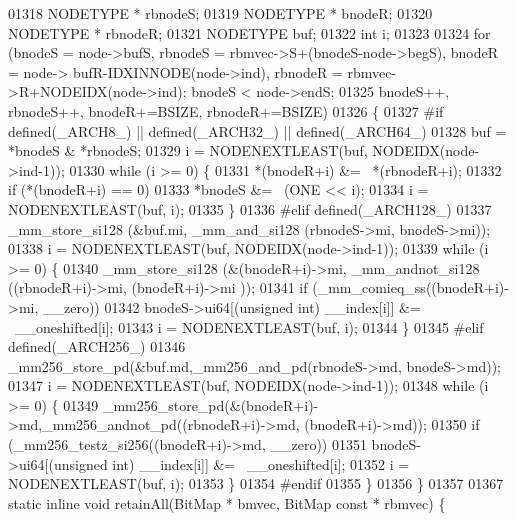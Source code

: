 \begin{DoxyCode}
{01318         NODETYPE * rbnodeS;
01319         NODETYPE * bnodeR;
01320         NODETYPE * rbnodeR;
01321         NODETYPE buf;
01322         \textcolor{keywordtype}{int} i;
01323 
01324         \textcolor{keywordflow}{for} (bnodeS = node->bufS, rbnodeS = rbmvec->S+(bnodeS-node->begS), bnodeR = node->
      bufR-IDXINNODE(node->ind), rbnodeR = rbmvec->R+NODEIDX(node->ind); bnodeS < node->endS;
01325                         bnodeS++, rbnodeS++, bnodeR+=BSIZE, rbnodeR+=BSIZE)
01326         \{
01327 \textcolor{preprocessor}{#if defined(\_ARCH8\_) || defined(\_ARCH32\_) || defined(\_ARCH64\_)}
01328                 buf = *bnodeS & *rbnodeS;
01329                 i = NODENEXTLEAST(buf, NODEIDX(node->ind-1));
01330                 \textcolor{keywordflow}{while} (i >= 0) \{
01331                         *(bnodeR+i) &= ~*(rbnodeR+i);
01332                         \textcolor{keywordflow}{if} (*(bnodeR+i) == 0)
01333                                 *bnodeS &= ~(ONE << i);
01334                         i = NODENEXTLEAST(buf, i);
01335                 \}
01336 \textcolor{preprocessor}{#elif defined(\_ARCH128\_)}
01337                 \_mm\_store\_si128 (&buf.mi, \_mm\_and\_si128 (rbnodeS->mi, bnodeS->mi));
01338                 i = NODENEXTLEAST(buf, NODEIDX(node->ind-1));
01339                 \textcolor{keywordflow}{while} (i >= 0) \{
01340                         \_mm\_store\_si128 (&(bnodeR+i)->mi, \_mm\_andnot\_si128 ((rbnodeR+i)->mi, (bnodeR+i)->mi
      ));
01341                         \textcolor{keywordflow}{if} (\_mm\_comieq\_ss((bnodeR+i)->mi, \_\_zero))
01342                                 bnodeS->ui64[(\textcolor{keywordtype}{unsigned} int) \_\_index[i]] &= ~\_\_oneshifted[i];
01343                         i = NODENEXTLEAST(buf, i);
01344                 \}
01345 \textcolor{preprocessor}{#elif defined(\_ARCH256\_)}
01346                 \_mm256\_store\_pd(&buf.md,\_mm256\_and\_pd(rbnodeS->md, bnodeS->md));
01347                 i = NODENEXTLEAST(buf, NODEIDX(node->ind-1));
01348                 \textcolor{keywordflow}{while} (i >= 0) \{
01349                         \_mm256\_store\_pd(&(bnodeR+i)->md,\_mm256\_andnot\_pd((rbnodeR+i)->md, (bnodeR+i)->md));
01350                         \textcolor{keywordflow}{if} (\_mm256\_testz\_si256((bnodeR+i)->md, \_\_zero))
01351                                 bnodeS->ui64[(\textcolor{keywordtype}{unsigned} int) \_\_index[i]] &= ~\_\_oneshifted[i];
01352                         i = NODENEXTLEAST(buf, i);
01353                 \}
01354 \textcolor{preprocessor}{#endif}
01355         \}
01356 \}
01357 
01367 \textcolor{keyword}{static} \textcolor{keyword}{inline} \textcolor{keywordtype}{void} retainAll(BitMap * bmvec, BitMap \textcolor{keyword}{const} * rbmvec) \{
}
\end{DoxyCode}
